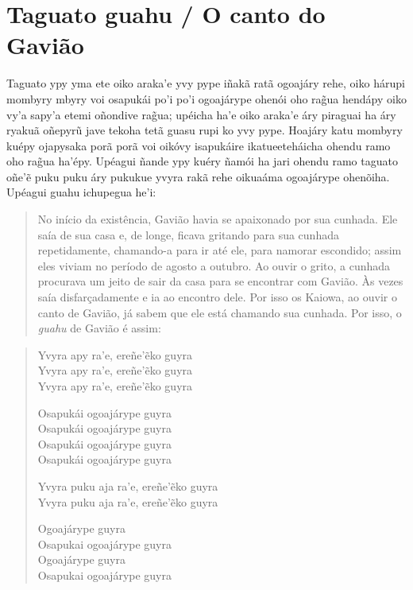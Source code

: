 \chapter{Taguato guahu / O canto do Gavião}

Taguato ypy yma ete oiko araka'e yvy pype iñakã ratã ogoajáry rehe, oiko
hárupi mombyry mbyry voi osapukái po'i po'i ogoajárype ohenói oho rag̃ua
hendápy oiko vy'a sapy'a etemi oñondive rag̃ua; upéicha ha'e oiko araka'e
áry piraguai ha áry ryakuã oñepyrũ jave tekoha tetã guasu rupi ko yvy
pype. Hoajáry katu mombyry kuépy ojapysaka porã porã voi oikóvy
isapukáire ikatueeteháicha ohendu ramo oho rag̃ua ha'épy. Upéagui ñande
ypy kuéry ñamói ha jari ohendu ramo taguato oñe'ẽ puku puku áry pukukue
yvyra rakã rehe oikuaáma ogoajárype ohenõiha. Upéagui guahu ichupegua
he'i:

\begin{quote}
No início da existência, Gavião havia se apaixonado por sua cunhada. Ele
saía de sua casa e, de longe, ficava gritando para sua cunhada
repetidamente, chamando-a para ir até ele, para namorar escondido; assim
eles viviam no período de agosto a outubro. Ao ouvir o grito, a cunhada
procurava um jeito de sair da casa para se encontrar com Gavião. Às
vezes saía disfarçadamente e ia ao encontro dele. Por isso os Kaiowa, ao
ouvir o canto de Gavião, já sabem que ele está chamando sua cunhada. Por
isso, o \emph{guahu} de Gavião é assim:
\end{quote}

\begin{verse}
Yvyra apy ra'e, ereñe'ẽko guyra\\
Yvyra apy ra'e, ereñe'ẽko guyra\\
Yvyra apy ra'e, ereñe'ẽko guyra

Osapukái ogoajárype guyra\\
Osapukái ogoajárype guyra\\
Osapukái ogoajárype guyra\\
Osapukái ogoajárype guyra

Yvyra puku aja ra'e, ereñe'ẽko guyra\\
Yvyra puku aja ra'e, ereñe'ẽko guyra

Ogoajárype guyra\\
Osapukai ogoajárype guyra\\
Ogoajárype guyra\\
Osapukai ogoajárype guyra
\end{verse}

